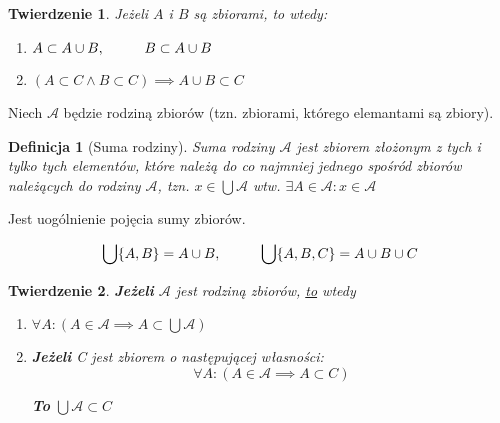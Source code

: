 \documentclass[a5paper,8pt]{article}
\theoremstyle{mythmstyle}
\newtheorem{definition}{Definicja}[section]
\newtheorem{theorem}{Twierdzenie}[section]
\newcommand\tab[1][1cm]{\hspace*{#1}}
\begin{document}
        \begin{theorem}
            Jeżeli $A$ i $B$ są zbiorami, to wtedy:

            \begin{enumerate}
                \item $ A \subset A \cup B, \tab B \subset A \cup B $

                \item $ ( A \subset C \wedge B \subset C ) \implies A \cup B \subset C $
            \end{enumerate}
        \end{theorem}

        \pagebreak
        Niech $ \mathcal{A} $ będzie rodziną zbiorów (tzn. zbiorami, którego elemantami są zbiory).

        \begin{definition}[Suma rodziny]
            Suma rodziny $ \mathcal{A} $ jest zbiorem złożonym z tych i tylko tych elementów, które należą do co najmniej jednego spośród zbiorów należących do rodziny $ \mathcal{A} $, tzn. $ x \in \bigcup \mathcal{A} $ wtw. $ \exists A \in \mathcal{A} : x \in \mathcal{A} $
        \end{definition}

        Jest uogólnienie pojęcia sumy zbiorów.

        \begin{equation*}
            \bigcup \{ A, B \} = A \cup B, \tab \bigcup \{ A, B, C \} = A \cup B \cup C
        \end{equation*}

        \begin{theorem}
            \textbf{Jeżeli} $ \mathcal{A} $ jest rodziną zbiorów, \underline{to} wtedy

            \begin{enumerate}
                \item $ \forall A : ( A \in \mathcal{A} \implies A \subset \bigcup \mathcal{A} ) $

                \item \textbf{Jeżeli} C jest zbiorem o następującej własności:
                    \begin{equation*}
                        \forall A : ( A \in \mathcal{A} \implies A \subset C )
                    \end{equation*}

                    \textbf{To} \tab $ \bigcup \mathcal{A} \subset C $
            \end{enumerate}
        \end{theorem}
\end{document}

